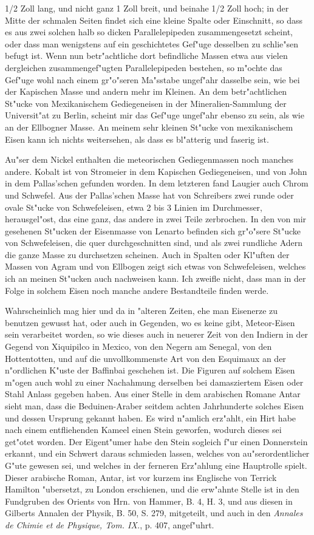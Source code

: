 \documentclass[a4paper, 11pt, oneside, polutonikogreek, german]{article}
\begin{document}
1/2 Zoll lang, und nicht ganz 1 Zoll breit, und beinahe 1/2 Zoll hoch; in der Mitte der schmalen Seiten findet sich eine kleine Spalte oder Einschnitt, so dass es aus zwei solchen halb so dicken Parallelepipeden zusammengesetzt scheint, oder dass man wenigstens auf ein geschichtetes Gef"uge desselben zu schlie"sen befugt ist. Wenn nun betr"achtliche dort befindliche Massen etwa aus vielen dergleichen zusammengef"ugten Parallelepipeden bestehen, so m"ochte das Gef"uge wohl nach einem gr"o"seren Ma"sstabe ungef"ahr dasselbe sein, wie bei der Kapischen Masse und andern mehr im Kleinen. An dem betr"achtlichen St"ucke von Mexikanischem Gediegeneisen in der Mineralien-Sammlung der Universit"at zu Berlin, scheint mir das Gef"uge ungef"ahr ebenso zu sein, als wie an der Ellbogner Masse. An meinem sehr kleinen St"ucke von mexikanischem Eisen kann ich nichts weitersehen, als dass es bl"atterig und faserig ist.

Au"ser dem Nickel enthalten die meteorischen Gediegenmassen noch manches andere. Kobalt ist von Stromeier in dem Kapischen Gediegeneisen, und von John in dem Pallas'schen gefunden worden. In dem letzteren fand Laugier auch Chrom und Schwefel. Aus der Pallas'schen Masse hat von Schreibers zwei runde oder ovale St"ucke von Schwefeleisen, etwa 2 bis 3 Linien im Durchmesser, herausgel"ost, das eine ganz, das andere in zwei Teile zerbrochen. In den von mir gesehenen St"ucken der Eisenmasse von Lenarto befinden sich gr"o"sere St"ucke von Schwefeleisen, die quer durchgeschnitten sind, und als zwei rundliche Adern die ganze Masse zu durchsetzen scheinen. Auch in Spalten oder Kl"uften der Massen von Agram und von Ellbogen zeigt sich etwas von Schwefeleisen, welches ich an meinen St"ucken auch nachweisen kann. Ich zweifle nicht, dass man in der Folge in solchem Eisen noch manche andere Bestandteile finden werde.

Wahrscheinlich mag hier und da in "alteren Zeiten, ehe man Eisenerze zu benutzen gewusst hat, oder auch in Gegenden, wo es keine gibt, Meteor-Eisen sein verarbeitet worden, so wie dieses auch in neuerer Zeit von den Indiern in der Gegend von Xiquipilco in Mexico, von den Negern am Senegal, von den Hottentotten, und auf die unvollkommenste Art von den Esquimaux an der n"ordlichen K"uste der Baffinbai geschehen ist. Die Figuren auf solchem Eisen m"ogen auch wohl zu einer Nachahmung derselben bei damasziertem Eisen oder Stahl Anlass gegeben haben. Aus einer Stelle in dem arabischen Romane Antar sieht man, dass die Beduinen-Araber seitdem achten Jahrhunderte solches Eisen und dessen Ursprung gekannt haben. Es wird n"amlich erz"ahlt, ein Hirt habe nach einem entfliehenden Kameel einen Stein geworfen, wodurch dieses sei get"otet worden. Der Eigent"umer habe den Stein sogleich f"ur einen Donnerstein erkannt, und ein Schwert daraus schmieden lassen, welches von au"serordentlicher G"ute gewesen sei, und welches in der ferneren Erz"ahlung eine Hauptrolle spielt. Dieser arabische Roman, Antar, ist vor kurzem ins Englische von Terrick Hamilton "ubersetzt, zu London erschienen, und die erw"ahnte Stelle ist in den Fundgruben des Orients von Hrn. von Hammer, B. 4, H. 3, und aus diesen in Gilberts Annalen der Physik, B. 50, S. 279, mitgeteilt, und auch in den \emph{Annales de Chimie et de Physique, Tom. IX.}, p. 407, angef"uhrt.
\end{document}
